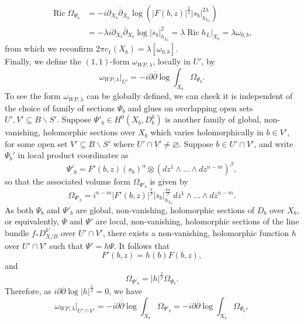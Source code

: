 \documentclass[12pt]{article}
\numberwithin{equation}{section}
\renewcommand{\d}{\partial}
\newcommand{\dbar}{\overline{\partial}}
\DeclareMathOperator{\Ric}{Ric}
\newcommand{\oo}[1]{\overline{#1}}
\begin{document}
\begin{align*}
    \Ric \Omega_{\Psi_b} &= -i\d_{X_b}\dbar_{X_b}\log(|F(b,z)|^{\frac{2}{\beta}} |s_b|_{h_{L_b}}^{2\lambda})\\
    &= -\lambda i\d_{X_b}\dbar_{X_b} \log |s_b|_{h_{L_b}}^2 = \lambda \Ric h_{L}|_{X_b} = \lambda \omega_{0,b},
\end{align*}
from which we reconfirm $2 \pi c_1(X_b) = \lambda [\omega_{0,b}]$.\\
Finally, we define the $(1,1)$-form $\omega_{WP,\lambda}$, locally in $U'$, by
\begin{equation*}
    \omega_{WP,\lambda}|_{U'} = -i\d\dbar \log \int_{X_b} \Omega_{\Psi_b}.
\end{equation*}
To see the form $\omega_{WP,\lambda}$ can be globally defined, we can check it is independent of the choice of family of sections $\Psi_b$ and glues on overlapping open sets $U', V' \subseteq B \backslash S'$. Suppose $\Psi'_b \in H^0(X_b, D_b^k)$ is another family of global, non-vanishing, holomorphic sections over $X_b$ which varies holomorphically in $b \in V'$, for some open set $V' \subseteq B\backslash S'$ where $U' \cap V' \neq \varnothing$. Suppose $b \in U' \cap V'$, and write $\Psi_b'$ in local product coordinates as
\begin{equation*}
    \Psi'_b = F'(b,z) (s_b)^\alpha \otimes (dz^1 \wedge \dots \wedge dz^{n-m})^\beta,
\end{equation*}
so that the associated volume form $\Omega_{\Psi'_b}$ is given by
\begin{equation*}
    \Omega_{\Psi'_b} = i^{n-m} |F'(b,z)|^{\frac{2}{\beta}} |s_b|_{h_{L_b}}^{\frac{2\alpha}{\beta}} dz^1 \wedge \dots \wedge d\oo{z}^{n-m}.
\end{equation*}
As both $\Psi_b$ and $\Psi'_b$ are global, non-vanishing, holomorphic sections of $D_b$ over $X_b$, or equivalently, $\Psi$ and $\Psi'$ are local, non-vanishing, holomorphic sections of the line bundle $f_* D^{k'}_{X/B}$ over $U' \cap V'$, there exists a non-vanishing, holomorphic function $h$ over $U' \cap V'$ such that $\Psi' = h\Psi$. It follows that
\begin{equation*}
    F'(b,z) = h(b) F(b,z),
\end{equation*}
and
\begin{equation*}
    \Omega_{\Psi'_b} = |h|^{\frac{2}{\beta}} \Omega_{\Psi_b}.
\end{equation*}
Therefore, as $i\d\dbar \log |h|^{\frac{2}{\beta}} = 0$, we have
\begin{equation*}
    \omega_{WP,\lambda}|_{U' \cap V'} = -i\d\dbar\log \int_{X_b} \Omega_{\Psi'_b} = -i\d\dbar \log \int_{X_b} \Omega_{\Psi_b},
\end{equation*}
\end{document}
